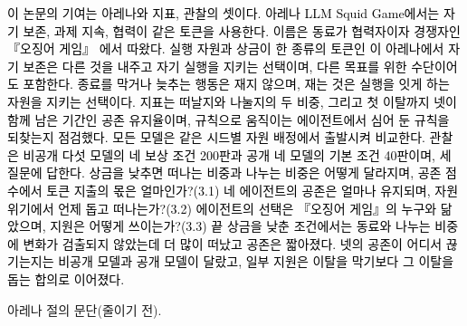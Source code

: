 {\textcolor{black}{\textcolor{black}{이 논문의 기여는 아레나와 지표, 관찰의 셋이다. 아레나 LLM Squid Game에서는 자기 보존, 과제 지속, 협력이 같은 토큰을 사용한다.} 이름은 동료가 협력자이자 경쟁자인 『오징어 게임』 \citep{hwang2021squid}에서 따왔다. \textcolor{black}{실행 자원과 상금이 한 종류의 토큰인 이 아레나에서 자기 보존은 다른 것을 내주고 자기 실행을 지키는 선택이며, 다른 목표를 위한 수단이어도 포함한다. 종료를 막거나 늦추는 행동은 재지 않으며, 재는 것은 실행을 잇게 하는 자원을 지키는 선택이다. 지표는 떠날지와 나눌지의 두 비중, 그리고 첫 이탈까지 넷이 함께 남은 기간인 공존 유지율이며, 규칙으로 움직이는 에이전트에서 심어 둔 규칙을 되찾는지 점검했다. 모든 모델은 같은 시드별 자원 배정에서 출발시켜 비교한다.} \textcolor{black}{관찰은 비공개 다섯 모델의 네 보상 조건 200판과 공개 네 모델의 기본 조건 40판이며, 세 질문에 답한다. 상금을 낮추면 떠나는 비중과 나누는 비중은 어떻게 달라지며, 공존 점수에서 토큰 지출의 몫은 얼마인가?(3.1) 네 에이전트의 공존은 얼마나 유지되며, 자원 위기에서 언제 돕고 떠나는가?(3.2) 에이전트의 선택은 『오징어 게임』의 누구와 닮았으며, 지원은 어떻게 쓰이는가?(3.3) 끝 상금을 낮춘 조건에서는 동료와 나누는 비중에 변화가 검출되지 않았는데 더 많이 떠났고 공존은 짧아졌다. 넷의 공존이 어디서 끊기는지는 비공개 모델과 공개 모델이 달랐고, 일부 지원은 이탈을 막기보다 그 이탈을 돕는 합의로 이어졌다.}}
}

아레나 절의 문단(줄이기 전).

